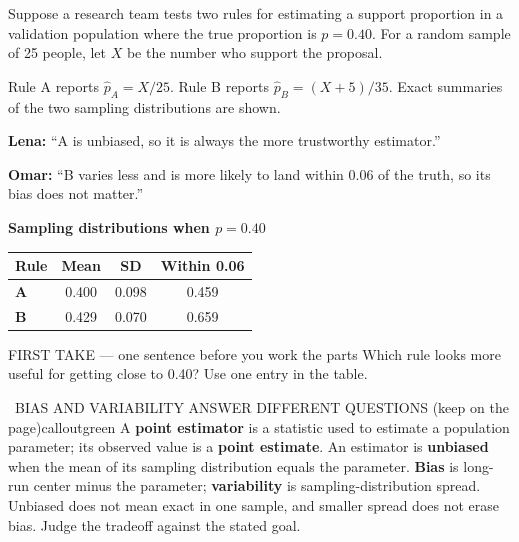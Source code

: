 \documentclass[11pt]{article}
\begin{document}


Suppose a research team tests two rules for estimating a support proportion in a validation population where the true proportion is $p=0.40$. For a random sample of 25 people, let $X$ be the number who support the proposal.\par\smallskip Rule A reports $\widehat p_A=X/25$. Rule B reports $\widehat p_B=(X+5)/35$. Exact summaries of the two sampling distributions are shown.\par\smallskip \textbf{Lena:} ``A is unbiased, so it is always the more trustworthy estimator.''\par \textbf{Omar:} ``B varies less and is more likely to land within 0.06 of the truth, so its bias does not matter.''\par
\begin{center}
\textbf{Sampling distributions when $p=0.40$}\par\smallskip
\begin{tabular}{|l|c|c|c|}
\hline
\textbf{Rule} & \textbf{Mean} & \textbf{SD} & \textbf{Within 0.06} \\ \hline
\textbf{A} & 0.400 & 0.098 & 0.459 \\ \hline
\textbf{B} & 0.429 & 0.070 & 0.659 \\ \hline
\end{tabular}
\end{center}
\begin{firsttakebox}{FIRST TAKE --- one sentence before you work the parts}
Which rule looks more useful for getting close to 0.40? Use one entry in the table.
\workspace{0.9in}
\end{firsttakebox}

\begin{callout}{\IconBook\ BIAS AND VARIABILITY ANSWER DIFFERENT QUESTIONS (keep on the page)}{calloutgreen}
A \textbf{point estimator} is a statistic used to estimate a population parameter; its observed value is a
\textbf{point estimate}. An estimator is \textbf{unbiased} when the mean of its sampling distribution equals the
parameter. \textbf{Bias} is long-run center minus the parameter; \textbf{variability} is sampling-distribution spread.
Unbiased does not mean exact in one sample, and smaller spread does not erase bias. Judge the tradeoff against the stated goal.
\end{callout}
\end{document}
